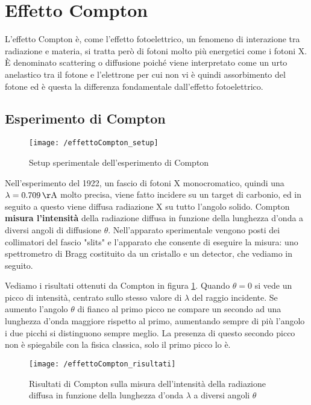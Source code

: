 
\section{Effetto Compton}

L'effetto Compton è, come l'effetto fotoelettrico, un fenomeno di interazione tra radiazione e materia, si tratta però di fotoni molto più energetici come i fotoni X.
È denominato scattering o diffusione poiché viene interpretato come un urto anelastico tra il fotone e l'elettrone per cui non vi è quindi assorbimento del fotone ed è questa la differenza fondamentale dall'effetto fotoelettrico.

\subsection{Esperimento di Compton}
\begin{figure}[h]
\centering
\texttt{[image: /effettoCompton\_setup]}
\caption{Setup sperimentale dell'esperimento di Compton}
\end{figure}

Nell'esperimento del 1922, un fascio di fotoni X monocromatico, quindi una $\lambda = \SI{0.709}{\AA}$ molto precisa, viene fatto incidere su un target di carbonio, ed in seguito a questo viene diffusa radiazione X su tutto l'angolo solido.
Compton \textbf{misura l'intensità} della radiazione diffusa in funzione della lunghezza d'onda a diversi angoli di diffusione $\theta$.
Nell'apparato sperimentale vengono posti dei collimatori del fascio "slits" e l'apparato che consente di eseguire la misura: uno spettrometro di Bragg costituito da un cristallo e un detector, che vediamo in seguito.

Vediamo i risultati ottenuti da Compton in figura \ref{compton_results}.
Quando $\theta = 0$ si vede un picco di intensità, centrato sullo stesso valore di $\lambda$ del raggio incidente.
Se aumento l'angolo $\theta$ di fianco al primo picco ne compare un secondo ad una lunghezza d'onda maggiore rispetto al primo,
aumentando sempre di più l'angolo i due picchi si distinguono sempre meglio.
La presenza di questo secondo picco non è spiegabile con la fisica classica, solo il primo picco lo è.

\begin{figure}[h]
\centering
\texttt{[image: /effettoCompton\_risultati]}
\caption{Risultati di Compton sulla misura dell'intensità della radiazione diffusa in funzione della lunghezza d'onda $\lambda$ a diversi angoli $\theta$}
\label{compton_results}
\end{figure}


